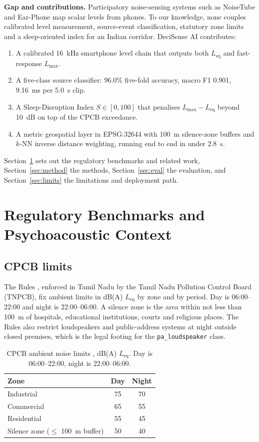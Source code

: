 \documentclass[conference]{IEEEtran}
\newcommand{\Leq}{L_{\text{eq}}}
\newcommand{\Lmax}{L_{\max}}
\newcommand{\cls}[1]{\texttt{#1}}
\begin{document}
\textbf{Gap and contributions.} Participatory noise-sensing systems such as NoiseTube \cite{noisetube} and Ear-Phone \cite{earphone} map scalar levels from phones. To our knowledge, none couples calibrated level measurement, source-event classification, statutory zone limits and a sleep-oriented index for an Indian corridor. DeciSense AI contributes:
\begin{enumerate}
\item A calibrated 16~kHz smartphone level chain that outputs both $\Leq$ and fast-response $\Lmax$.
\item A five-class source classifier: 96.0\% five-fold accuracy, macro F1 0.901, 9.16~ms per 5.0~s clip.
\item A Sleep-Disruption Index $S\in[0,100]$ that penalises $\Lmax-\Leq$ beyond 10~dB on top of the CPCB exceedance.
\item A metric geospatial layer in EPSG:32644 with 100~m silence-zone buffers and $k$-NN inverse distance weighting, running end to end in under 2.8~s.
\end{enumerate}
Section~\ref{sec:reg} sets out the regulatory benchmarks and related work, Section~\ref{sec:method} the methods, Section~\ref{sec:eval} the evaluation, and Section~\ref{sec:limits} the limitations and deployment path.

\section{Regulatory Benchmarks and Psychoacoustic Context}
\label{sec:reg}

\subsection{CPCB limits}

The Rules \cite{cpcb2000}, enforced in Tamil Nadu by the Tamil Nadu Pollution Control Board (TNPCB), fix ambient limits in dB(A) $\Leq$ by zone and by period. Day is 06:00--22:00 and night is 22:00--06:00. A silence zone is the area within not less than 100~m of hospitals, educational institutions, courts and religious places. The Rules also restrict loudspeakers and public-address systems at night outside closed premises, which is the legal footing for the \cls{pa\_loudspeaker} class.

\begin{table}[!t]
\caption{CPCB ambient noise limits \cite{cpcb2000}, dB(A) $\Leq$. Day is 06:00--22:00, night is 22:00--06:00.}
\label{tab:cpcb}
\centering
\small
\renewcommand{\arraystretch}{1.15}
\begin{tabular}{@{}lcc@{}}
\toprule
Zone & Day & Night \\
\midrule
Industrial & 75 & 70 \\
Commercial & 65 & 55 \\
Residential & 55 & 45 \\
Silence zone ($\le$ 100~m buffer) & 50 & 40 \\
\bottomrule
\end{tabular}
\end{table}
\end{document}
